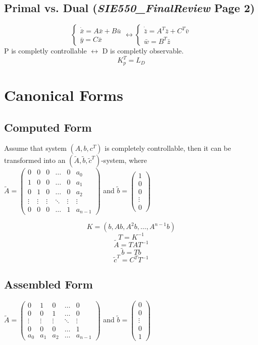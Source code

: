 \documentclass[12pt]{article}
\begin{document}
\subsection*{Primal vs. Dual ({\em SIE550\_FinalReview} Page 2)}
$$
\begin{cases}
	\dot{\bar{x}}=A\bar{x}+B\bar{u} \\
	\bar{y}=C\bar{x}
\end{cases}
\longleftrightarrow
\begin{cases}
	\dot{\bar{z}}=A^T\bar{z}+C^T\bar{v} \\
	\bar{w}=B^T\bar{z}
\end{cases}
$$
P is completly controllable $\leftrightarrow$ D is completly observable.
$$K_p^T=L_D$$

\section*{Canonical Forms}

\subsection*{Computed Form}
Assume that system $(A, b, c^T)$ is completely controllable, then it can be transformed into an $(\tilde{A}, \tilde{b}, \tilde{c}^T)$-system, where \\
$\tilde{A}=
\begin{pmatrix}
	0 & 0 & 0 & \dots & 0 & a_0 \\
	1 & 0 & 0 & \dots & 0 & a_1 \\
	0 & 1 & 0 & \dots & 0 & a_2 \\
	\vdots & \vdots & \vdots & \ddots & \vdots & \vdots \\
	0 & 0 & 0 & \dots & 1 & a_{n-1} 
\end{pmatrix}$ and 
$\tilde{b}=\begin{pmatrix}
1\\
0\\
0\\
\vdots\\
0
\end{pmatrix}$

$$K=(b,Ab,A^2b,\dots,A^{n-1}b)$$
$$T = K^{-1}$$
$$\tilde{A}=TAT^{-1}$$
$$\tilde{b}=Tb$$
$$\tilde{c}^T=C^TT^{-1}$$

\subsection*{Assembled Form}
$\tilde{A}=
\begin{pmatrix}
	0 & 1 & 0 & \dots & 0 \\
	0 & 0 & 1 & \dots & 0 \\
	\vdots & \vdots & \vdots & \ddots & \vdots \\
	0 & 0 & 0 & \dots & 1 \\
	a_0 & a_1 & a_2 & \dots & a_{n-1} 
\end{pmatrix}$ and 
$\tilde{b}=\begin{pmatrix}
0\\
0\\
\vdots\\
0\\
1
\end{pmatrix}$
\end{document}
